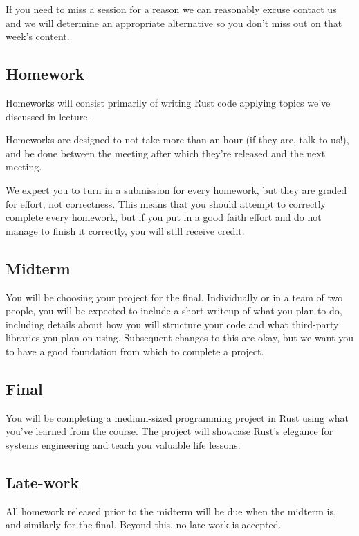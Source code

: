 \documentclass{article}
\begin{document}
If you need to miss a session for a reason we can reasonably excuse contact us
and we will determine an appropriate alternative so you don't miss out on that
week's content.

\subsection*{Homework}
 
Homeworks will consist primarily of writing Rust code applying topics we've
discussed in lecture.

Homeworks are designed to not take more than an hour (if they are, talk to us!),
and be done between the meeting after which they're released and the next
meeting.

We expect you to turn in a submission for every homework, but they are graded
for effort, not correctness. This means that you should attempt to correctly
complete every homework, but if you put in a good faith effort and do not manage
to finish it correctly, you will still receive credit.

\subsection*{Midterm}

You will be choosing your project for the final. Individually or in a team of
two people, you will be expected to include a short writeup of what you plan to
do, including details about how you will structure your code and what
third-party libraries you plan on using. Subsequent changes to this are okay,
but we want you to have a good foundation from which to complete a project.

\subsection*{Final}

You will be completing a medium-sized programming project in Rust using what
you've learned from the course. The project will showcase Rust's elegance for
systems engineering and teach you valuable life lessons.

\subsection*{Late-work}

All homework released prior to the midterm will be due when the midterm is, and
similarly for the final. Beyond this, no late work is accepted.
\end{document}

